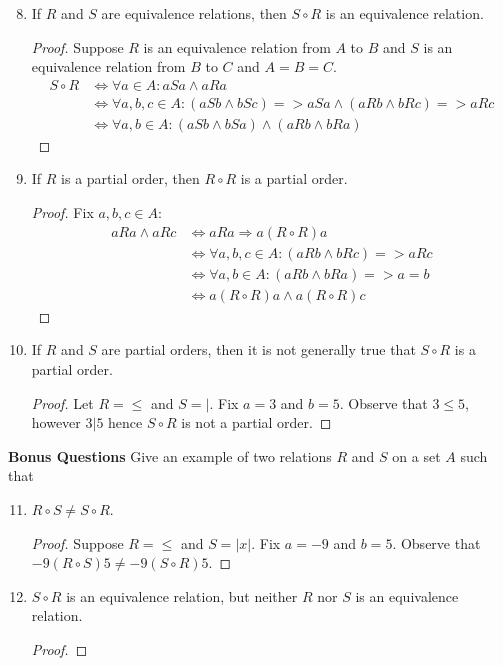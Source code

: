 \documentclass{article}
\begin{document}
  \begin{enumerate} \setcounter{enumi}{7}
    \item If $R$ and $S$ are equivalence relations, then $S \circ R$ is an equivalence relation.
      \begin{proof}
        Suppose $R$ is an equivalence relation from $A$ to $B$ and $S$ is an equivalence relation from $B$ to $C$ and $A = B = C$.
        \begin{align*}
          S \circ R &\iff \forall a\in A : aSa \wedge aRa \\
          &\iff \forall a,b,c\in A: (aSb \wedge bSc) => aSa \wedge (aRb \wedge bRc) => aRc \\
            &\iff \forall a,b\in A: (aSb \wedge bSa) \wedge (aRb \wedge bRa) 
        \end{align*}
      \end{proof}
    \item If $R$ is a partial order, then $R \circ R$ is a partial order.
      \begin{proof}
        Fix $a,b,c\in A$:
        \begin{align*}
          aRa \wedge aRc &\iff aRa \Rightarrow a(R \circ R)a \\
            &\iff \forall a,b, c\in A: (aRb \wedge bRc) => aRc \\
            &\iff \forall a,b\in A: (aRb \wedge bRa) => a = b \\
            &\iff a(R \circ R)a \wedge a(R \circ R)c
        \end{align*}
      \end{proof}
    \item If $R$ and $S$ are partial orders, then it is not generally true that $S \circ R$ is a partial order.
      \begin{proof}
        Let $R = \le$ and $S = |$. Fix $a = 3$ and $b = 5$. Observe that $3 \le 5$, however $3 | 5$ hence $S \circ R$ is not a partial order.
      \end{proof}
  \end{enumerate}
  \textbf{Bonus Questions}
  Give an example of two relations $R$ and $S$ on a set $A$ such that \\
  \begin{enumerate} \setcounter{enumi}{10}
    \item $R \circ S \neq S \circ R$.
      \begin{proof}
        Suppose $R = \le$ and $S = |x|$. Fix $a = -9$ and $b = 5$. Observe that $-9 (R \circ S)5 \neq -9 (S \circ R) 5$.  
      \end{proof}
    \item $S \circ R$ is an equivalence relation, but neither $R$ nor $S$ is an equivalence relation.
      \begin{proof}
        
      \end{proof}
   \end{enumerate}
\end{document}
